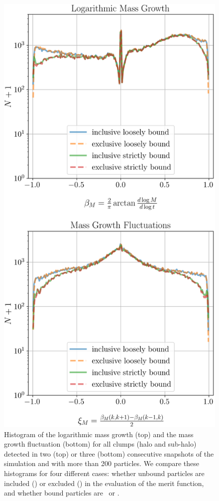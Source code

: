 \begin{figure}
  \centering
  \includegraphics[width=.9\linewidth, keepaspectratio]{images/tree-statistics-my-threshold/mass-statistics-inc-excl.png}%
  \caption{Histogram of the logarithmic mass growth (top) and the mass
    growth fluctuation (bottom) for all clumps (halo and sub-halo)
    detected in two (top) or three (bottom) consecutive snapshots of
    the simulation and with more than 200 particles. We compare these
    histograms for four different cases: whether unbound particles are
    included (\inc) or excluded (\exc) in the evaluation of the merit
    function, and whether bound particles are \nosad\ or \sad.
  }%
  \label{fig:saddle_nosaddle_masses}
\end{figure}

